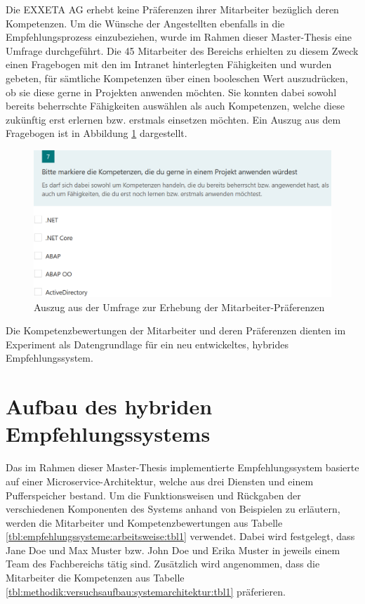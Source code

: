 Die EXXETA AG erhebt keine Präferenzen ihrer Mitarbeiter bezüglich deren Kompetenzen. Um die Wünsche der Angestellten ebenfalls in die Empfehlungsprozess einzubeziehen, wurde im Rahmen dieser Master-Thesis eine Umfrage durchgeführt. Die 45 Mitarbeiter des Bereichs \JES erhielten zu diesem Zweck einen Fragebogen mit den \anzFaehigkeiten im Intranet hinterlegten Fähigkeiten und wurden gebeten, für sämtliche Kompetenzen über einen booleschen Wert auszudrücken, ob sie diese gerne in Projekten anwenden möchten. Sie konnten dabei sowohl bereits beherrschte Fähigkeiten auswählen als auch Kompetenzen, welche diese zukünftig erst erlernen bzw. erstmals einsetzen möchten. Ein Auszug aus dem Fragebogen ist in Abbildung \ref{fig:methodik:versuchsaufbau:abb1} dargestellt.

\begin{figure}[h]
	\centering
	\includegraphics[width=1\textwidth]{gfx/Umfage_Faehigkeiten.png}
	\caption{Auszug aus der Umfrage zur Erhebung der Mitarbeiter-Präferenzen}
	\label{fig:methodik:versuchsaufbau:abb1}
\end{figure}

Die Kompetenzbewertungen der Mitarbeiter und deren Präferenzen dienten im Experiment als Datengrundlage für ein neu entwickeltes, hybrides Empfehlungssystem.

\section{Aufbau des hybriden Empfehlungssystems}
\label{ch:methodik:versuchsaufbau:systemarchitektur}
Das im Rahmen dieser Master-Thesis implementierte Empfehlungssystem basierte auf einer Microservice-Architektur, welche aus drei Diensten und einem Pufferspeicher bestand. Um die Funktionsweisen und Rückgaben der verschiedenen Komponenten des Systems anhand von Beispielen zu erläutern, werden die Mitarbeiter und Kompetenzbewertungen aus Tabelle \ref{tbl:empfehlungssysteme:arbeitsweise:tbl1} verwendet. Dabei wird festgelegt, dass Jane Doe und Max Muster bzw. John Doe und Erika Muster in jeweils einem Team des Fachbereichs \JES tätig sind. Zusätzlich wird angenommen, dass die Mitarbeiter die Kompetenzen aus Tabelle \ref{tbl:methodik:versuchsaufbau:systemarchitektur:tbl1} präferieren.

